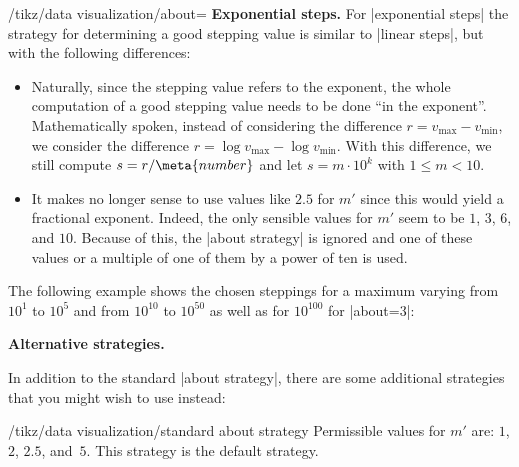 \begin{key}{/tikz/data visualization/about=}
    \medskip
    \textbf{Exponential steps.}
    For |exponential steps| the strategy for determining a good stepping value
    is similar to |linear steps|, but with the following differences:
    \begin{itemize}
        \item Naturally, since the stepping value refers to the exponent, the
            whole computation of a good stepping value needs to be done ``in
            the exponent''. Mathematically spoken, instead of considering the
            difference $r = v_{\max} - v_{\min}$, we consider the difference $r
            = \log v_{\max} - \log v_{\min}$. With this difference, we still
            compute $s = r / \meta{number}$ and let $s = m \cdot 10^k$ with $1
            \le m < 10$.
        \item It makes no longer sense to use values like $2.5$ for $m'$ since
            this would yield a fractional exponent. Indeed, the only sensible
            values for $m'$ seem to be $1$, $3$, $6$, and $10$. Because of
            this, the |about strategy| is ignored and one of these values or a
            multiple of one of them by a power of ten is used.
    \end{itemize}

    The following example shows the chosen steppings for a maximum varying from
    $10^1$ to $10^5$ and from $10^{10}$ to $10^{50}$ as well as for $10^{100}$
    for |about=3|:

    \medskip


    \medskip
    \textbf{Alternative strategies.}

    In addition to the standard |about strategy|, there are some additional
    strategies that you might wish to use instead:

    \begin{key}{/tikz/data visualization/standard about strategy}
        Permissible values for $m'$ are: $1$, $2$, $2.5$, and~$5$. This
        strategy is the default strategy.
    \end{key}


\end{key}
